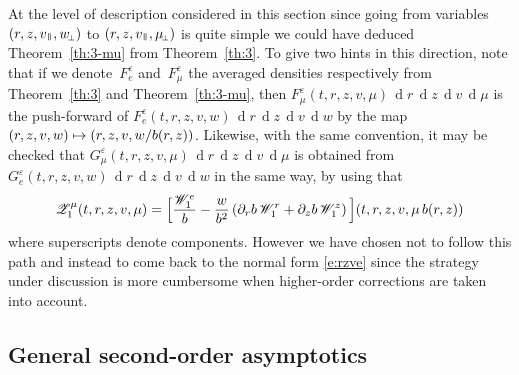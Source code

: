 \documentclass[10pt]{amsart}
\let\mathcal\mathscr
\newcommand\mto{\mathchoice{\longmapsto}{\mapsto}{\mapsto}{\mapsto}}
\newcommand{\sperp}{{\scriptscriptstyle\perp}}
\let\eps\varepsilon
\let\d\partial
\DeclareMathOperator\dD{d}\let\dd\dD
\theoremstyle{plain}
\theoremstyle{definition}
\newcommand\cW{{\mathcal W}}
\newcommand\cZ{{\mathcal Z}}
\newcommand\vpar{v_\mypar}
\newcommand\eperp{w_{\!\sperp}}
\let\e w
\newcommand\muperp{\mu_{\!\sperp}}
\newcommand{\mypar}{{\mkern3mu\vphantom{\perp}\vrule depth 0pt\mkern2mu\vrule depth 0pt\mkern3mu}}
\begin{document}
At the level of description considered in this section since going from variables $(r,z,\vpar,\eperp)$ to $(r,z,\vpar,\muperp)$ is quite simple we could have deduced Theorem~\ref{th:3-mu} from Theorem~\ref{th:3}. To give two hints in this direction, note that if we denote~$F^\eps_e$ and~$F^\eps_\mu$ the averaged densities respectively from Theorem~\ref{th:3} and Theorem~\ref{th:3-mu}, then $F^\eps_\mu(t,r,z,v,\mu)\,\dD\!r\,\dD\!z\,\dD\!v\,\dD\!\mu$ is the push-forward of $F^\eps_e(t,r,z,v,\e)\,\dD\!r\,\dD\!z\,\dD\!v\,\dD\!\e$ by the map $(r,z,v,\e)\mto (r,z,v,\e/b(r,z))$. Likewise, with the same convention, it may be checked that $G^\eps_\mu(t,r,z,v,\mu)\,\dD\!r\,\dD\!z\,\dD\!v\,\dD\!\mu$ is obtained from $G^\eps_e(t,r,z,v,\e)\,\dD\!r\,\dD\!z\,\dD\!v\,\dD\!\e$ in the same way, by using that
\[
\cZ_1^{\mu}(t,r,z,v,\mu)
=
\Bigl[\frac{\cW_1^e}{b}
-\frac{\e}{b^2}\left(\d_rb\,\cW_1^r
+\d_zb\,\cW_1^z\right)\Bigl](t,r,z,v,\mu\,b(r,z))
\]
where superscripts denote components. However we have chosen not to follow this path and instead to come back to the normal form \eqref{e:rzve} since the strategy under discussion is more cumbersome when higher-order corrections are taken into account.

\subsection{General second-order asymptotics}
\end{document}
